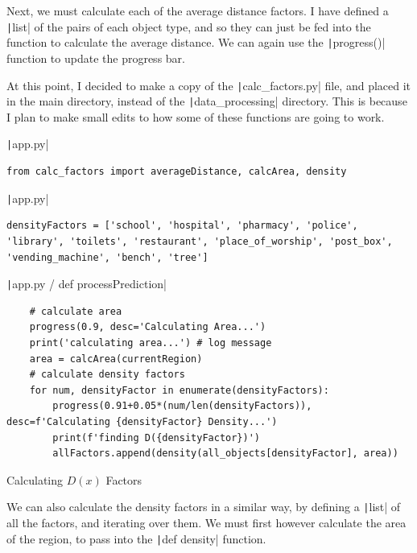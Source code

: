 \documentclass[12pt]{report}
\newcommand{\pil}[1]{\protect\texttt|#1|}
\begin{document}
Next, we must calculate each of the average distance factors. I have defined a \pil{list} of the pairs of each object type, and so they can just be fed into the function to calculate the average distance. We can again use the \pil{progress()} function to update the progress bar.

At this point, I decided to make a copy of the \pil{calc_factors.py} file, and placed it in the main directory, instead of the \pil{data_processing} directory. This is because I plan to make small edits to how some of these functions are going to work.

\begin{listing}[H]
\pil{app.py}
\begin{verbatim}
from calc_factors import averageDistance, calcArea, density
\end{verbatim}
\pil{app.py}
\begin{verbatim}
densityFactors = ['school', 'hospital', 'pharmacy', 'police', 'library', 'toilets', 'restaurant', 'place_of_worship', 'post_box', 'vending_machine', 'bench', 'tree']
\end{verbatim}
\pil{app.py / def processPrediction}
\begin{verbatim}
    # calculate area
    progress(0.9, desc='Calculating Area...')
    print('calculating area...') # log message
    area = calcArea(currentRegion)
    # calculate density factors
    for num, densityFactor in enumerate(densityFactors):
        progress(0.91+0.05*(num/len(densityFactors)), desc=f'Calculating {densityFactor} Density...')
        print(f'finding D({densityFactor})')
        allFactors.append(density(all_objects[densityFactor], area))
\end{verbatim}
\caption{Calculating $D\left(x\right)$ Factors}\label{cs:predictionDensity}
\end{listing}

We can also calculate the density factors in a similar way, by defining a \pil{list} of all the factors, and iterating over them. We must first however calculate the area of the region, to pass into the \pil{def density} function.

\begin{center}
\end{center}
\end{document}
